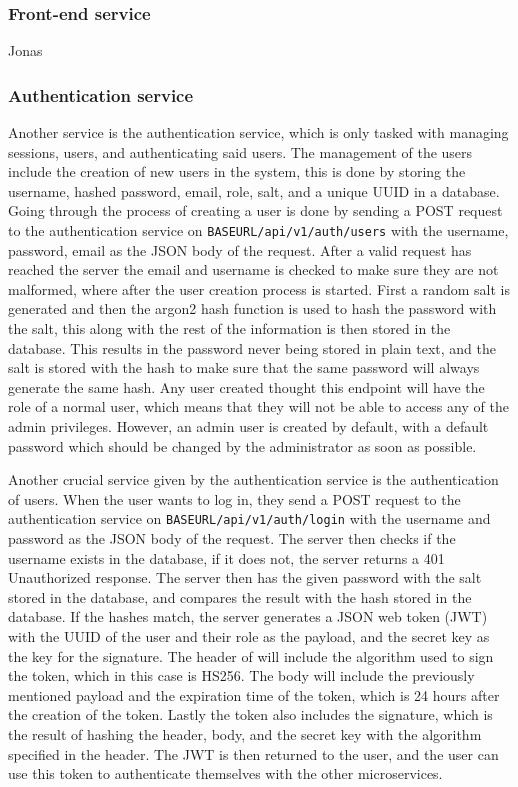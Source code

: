 \documentclass[a4paper,12pt]{article}
\begin{document}
\subsubsection{Front-end service}

Jonas

\subsubsection{Authentication service}
\label{sec:auth}

Another service is the authentication service, which is only tasked with managing sessions, users, and authenticating said users.
The management of the users include the creation of new users in the system,
this is done by storing the username, hashed password, email, role, salt, and a unique UUID in a database.
Going through the process of creating a user is done by sending a POST request to the authentication service on \verb|BASEURL/api/v1/auth/users| with the 
username, password, email as the JSON body of the request.
After a valid request has reached the server the email and username is checked to make sure they are not malformed, where after the user creation process is started.
First a random salt is generated and then the argon2 hash function is used to hash the password with the salt, this along with the rest of the information is then stored in the database.
This results in the password never being stored in plain text, and the salt is stored with the hash to make sure that the same password will always generate the same hash.
Any user created thought this endpoint will have the role of a normal user, which means that they will not be able to access any of the admin privileges.
However, an admin user is created by default, with a default password which should be changed by the administrator as soon as possible.


Another crucial service given by the authentication service is the authentication of users.
When the user wants to log in, they send a POST request to the authentication service on \verb|BASEURL/api/v1/auth/login| with the username and password as the JSON body of the request.
The server then checks if the username exists in the database, if it does not, the server returns a 401 Unauthorized response.
The server then has the given password with the salt stored in the database, and compares the result with the hash stored in the database.
If the hashes match, the server generates a JSON web token (JWT) with the UUID of the user and their role as the payload, and the secret key as the key for the signature.
The header of will include the algorithm used to sign the token, which in this case is HS256.
The body will include the previously mentioned payload and the expiration time of the token, which is 24 hours after the creation of the token.
Lastly the token also includes the signature, which is the result of hashing the header, body, and the secret key with the algorithm specified in the header.
The JWT is then returned to the user, and the user can use this token to authenticate themselves with the other microservices.
\end{document}

